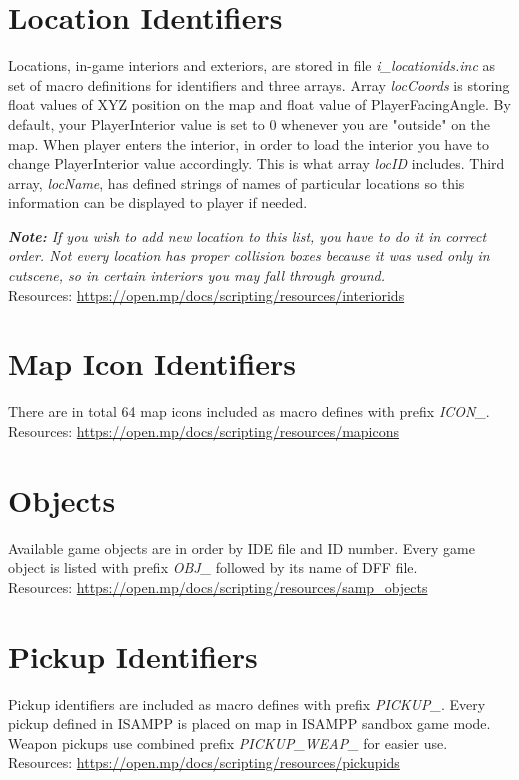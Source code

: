 \documentclass{article}
\begin{document}
\section{Location Identifiers}
\begin{sloppypar}
Locations, in-game interiors and exteriors, are stored in file \textit{i\_locationids.inc} as set of macro definitions for identifiers and three arrays. Array \textit{locCoords} is storing float values of XYZ position on the map and float value of PlayerFacingAngle. By default, your PlayerInterior value is set to 0 whenever you are "outside" on the map. When player enters the interior, in order to load the interior you have to change PlayerInterior value accordingly. This is what array \textit{locID} includes. Third array, \textit{locName}, has defined strings of names of particular locations so this information can be displayed to player if needed.
\end{sloppypar}
\bigskip
\noindent \textit{\textbf{Note:} If you wish to add new location to this list, you have to do it in correct order. Not every location has proper collision boxes because it was used only in cutscene, so in certain interiors you may fall through ground.}
\bigskip
\\Resources: \url{https://open.mp/docs/scripting/resources/interiorids}


\section{Map Icon Identifiers}
There are in total 64 map icons included as macro defines with prefix \textit{ICON\_}.
\bigskip
\\Resources: \url{https://open.mp/docs/scripting/resources/mapicons}


\section{Objects}
Available game objects are in order by IDE file and ID number. Every game object is listed with prefix \textit{OBJ\_} followed by its name of DFF file.
\bigskip
\\Resources: \url{https://open.mp/docs/scripting/resources/samp_objects}


\newpage
\section{Pickup Identifiers}
Pickup identifiers are included as macro defines with prefix \textit{PICKUP\_}. Every pickup defined in ISAMPP is placed on map in ISAMPP sandbox game mode. Weapon pickups use combined prefix \textit{PICKUP\_WEAP\_} for easier use.
\bigskip
\\Resources: \url{https://open.mp/docs/scripting/resources/pickupids}
\end{document}
